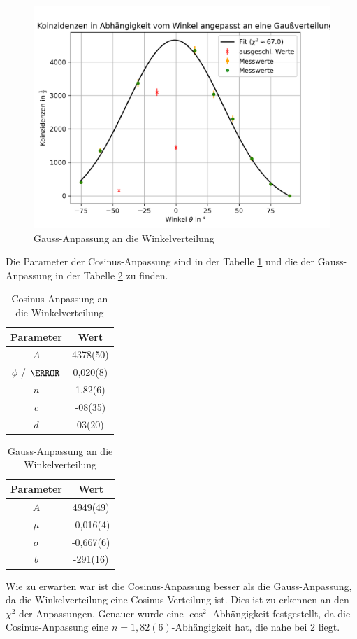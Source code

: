 \documentclass{article}
\begin{document}
\begin{figure}[H]
    \centering
    \includegraphics[width=1\textwidth]{figures/gaussAnpassung.png}
    \caption{Gauss-Anpassung an die Winkelverteilung}
    \label{fig:WinkelverteilungGauss}
\end{figure} 
Die Parameter der Cosinus-Anpassung sind in der Tabelle \ref{tab:CosinusAnpassungWinkelverteilung} und die der Gauss-Anpassung in der Tabelle \ref{tab:GaussAnpassungWinkelverteilung} zu finden.
\begin{table}[H]
    \centering
    \caption{Cosinus-Anpassung an die Winkelverteilung}
    \begin{tabular}{|c|c|}
        \hline
        Parameter & Wert \\ \hline
        $A$ & 4378(50) \\ \hline
        $\phi$ / $\radian$ & 0,020(8) \\ \hline
        $n$ & 1.82(6) \\ \hline
        $c$ & -08(35) \\ \hline
        $d$ & 03(20) \\ \hline
    \end{tabular}
    \label{tab:CosinusAnpassungWinkelverteilung}
\end{table}
\begin{table}[H]
    \centering
    \caption{Gauss-Anpassung an die Winkelverteilung}
    \begin{tabular}{|c|c|}
        \hline
        Parameter & Wert \\ \hline
        $A$ & 4949(49) \\ \hline
        $\mu$ & -0,016(4) \\ \hline
        $\sigma$ & -0,667(6) \\ \hline
        $b$ & -291(16) \\ \hline
    \end{tabular}
    \label{tab:GaussAnpassungWinkelverteilung}
\end{table}
Wie zu erwarten war ist die Cosinus-Anpassung besser als die Gauss-Anpassung, da die Winkelverteilung eine Cosinus-Verteilung ist. Dies ist zu erkennen an den $\chi^2$ der Anpassungen.
Genauer wurde eine $\cos^2$ Abhängigkeit festgestellt, da die Cosinus-Anpassung eine $n=1,82(6)$-Abhängigkeit hat, die nahe bei 2 liegt.
\end{document}
